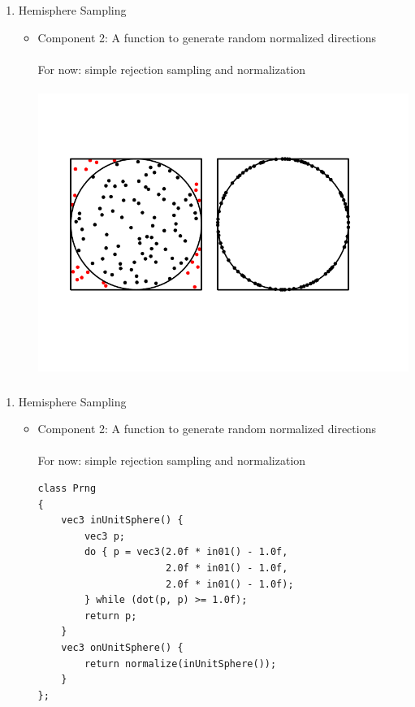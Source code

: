\documentclass[utf8,stillsansserifmath,fleqn,t]{beamer}
\newcommand{\labelname}[1]{\def\insertenumlabel{#1}\usebeamertemplate{enumerate item}}
\begin{document}
\begin{frame}
\frametitle{\insertsection}
\begin{enumerate}
\item[\labelname{5}] Hemisphere Sampling
\begin{itemize}
\item Component 2: A function to generate random normalized directions\\~\\
For now: simple rejection sampling and normalization\\~\\
\includegraphics[width=.7\textwidth]{./fig/sampling-uniform-directions.pdf}
\end{itemize}
\end{enumerate}
\end{frame}

\begin{frame}[fragile]
\frametitle{\insertsection}
\begin{enumerate}
\item[\labelname{5}] Hemisphere Sampling
\begin{itemize}
\item Component 2: A function to generate random normalized directions\\~\\
For now: simple rejection sampling and normalization\\
\begin{lstlisting}
class Prng
{
    vec3 inUnitSphere() {
        vec3 p;
        do { p = vec3(2.0f * in01() - 1.0f,
                      2.0f * in01() - 1.0f,
                      2.0f * in01() - 1.0f);
        } while (dot(p, p) >= 1.0f);
        return p;
    }
    vec3 onUnitSphere() {
        return normalize(inUnitSphere());
    }
};
\end{lstlisting}
\end{itemize}
\end{enumerate}
\end{frame}
\end{document}
